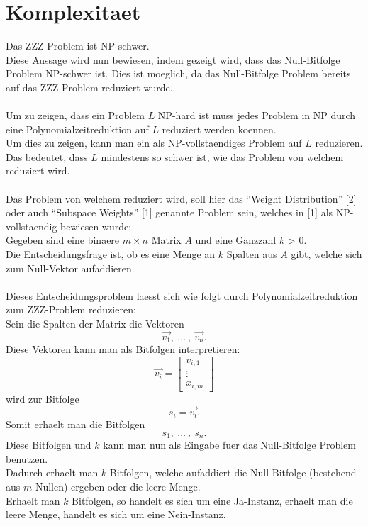 \documentclass[a4paper,10pt,ngerman]{scrartcl}
\begin{document}
\section{Komplexitaet}
Das ZZZ-Problem ist NP-schwer.\\
Diese Aussage wird nun bewiesen, indem gezeigt wird, dass das Null-Bitfolge Problem NP-schwer ist. Dies ist moeglich, da das Null-Bitfolge Problem bereits auf das ZZZ-Problem reduziert wurde.
\\
\\Um zu zeigen, dass ein Problem $L$ NP-hard ist muss jedes Problem in NP durch eine Polynomialzeitreduktion auf $L$ reduziert werden koennen.
\\Um dies zu zeigen, kann man ein als NP-vollstaendiges Problem auf $L$ reduzieren. Das bedeutet, dass $L$ mindestens so schwer ist, wie das Problem von welchem reduziert wird.\\
\\
Das Problem von welchem reduziert wird, soll hier das "`Weight Distribution"' [2] oder auch "`Subspace Weights"' [1] genannte Problem sein, welches in [1] als NP-vollstaendig bewiesen wurde:\\
Gegeben sind eine binaere $m \times n$ Matrix $A$ und eine Ganzzahl $k$ > 0.\\
Die Entscheidungsfrage ist, ob es eine Menge an $k$ Spalten aus $A$ gibt, welche sich zum Null-Vektor aufaddieren.
\\\\
Dieses Entscheidungsproblem laesst sich wie folgt durch Polynomialzeitreduktion zum ZZZ-Problem reduzieren:\\
Sein die Spalten der Matrix die Vektoren
$$
\vec{v_1}, \ \dots \ , \ \vec{v_n}.
$$
Diese Vektoren kann man als Bitfolgen interpretieren:
$$
\vec{v_i} = \begin{bmatrix}
           v_{i, 1} \\
           \vdots \\
           x_{i, m}
         \end{bmatrix} 
$$
wird zur Bitfolge 
$$
s_i = \vec{v_i}.
$$
Somit erhaelt man die Bitfolgen
$$
s_1, \ \dots \ , \ s_n.
$$
Diese Bitfolgen und $k$ kann man nun als Eingabe fuer das Null-Bitfolge Problem benutzen. 
\\
Dadurch erhaelt man $k$ Bitfolgen, welche aufaddiert die Null-Bitfolge (bestehend aus $m$ Nullen) ergeben oder die leere Menge.
\\Erhaelt man $k$ Bitfolgen, so handelt es sich um eine Ja-Instanz, erhaelt man die leere Menge, handelt es sich um eine Nein-Instanz.
\end{document}
